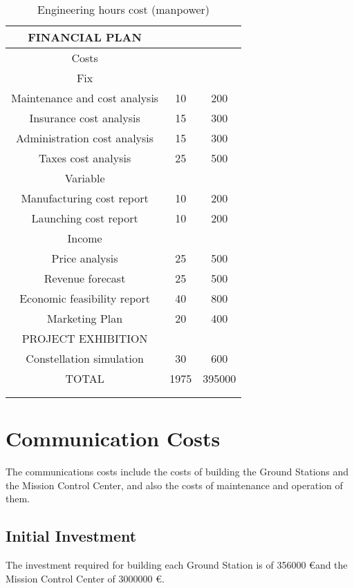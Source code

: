 \begin{longtable}{ccc}
	FINANCIAL PLAN &  &  \\ \hline
	Costs &  &  \\ \hline
	Fix &  &  \\ \hline
	Maintenance and cost analysis & 10 & 200 \\ \hline
	Insurance cost analysis & 15 & 300 \\ \hline
	Administration cost analysis & 15 & 300 \\ \hline
	Taxes cost analysis & 25 & 500 \\ \hline
	Variable &  &  \\ \hline
	Manufacturing cost report & 10 & 200 \\ \hline
	Launching cost report & 10 & 200 \\ \hline
	Income &  &  \\ \hline
	Price analysis & 25 & 500 \\ \hline
	Revenue forecast & 25 & 500 \\ \hline
	Economic feasibility report & 40 & 800 \\ \hline
	Marketing Plan & 20 & 400 \\ \hline
	\rowcolor[gray]{0.85}
	PROJECT EXHIBITION &  &  \\ \hline
	Constellation simulation & 30 & 600 \\ \hline
	\rowcolor[gray]{0.65}
	TOTAL & 1975 & 395000 \\
	\bottomrule\\
	\caption{Engineering hours cost (manpower)}
\end{longtable}



\section{Communication Costs}
The communications costs include the costs of building the Ground Stations and the Mission Control Center, and also the costs of maintenance and operation of them.
\subsection{Initial Investment}
The investment required for building each Ground Station is of 356000 \euro and the Mission Control Center of 3000000 \euro. 


